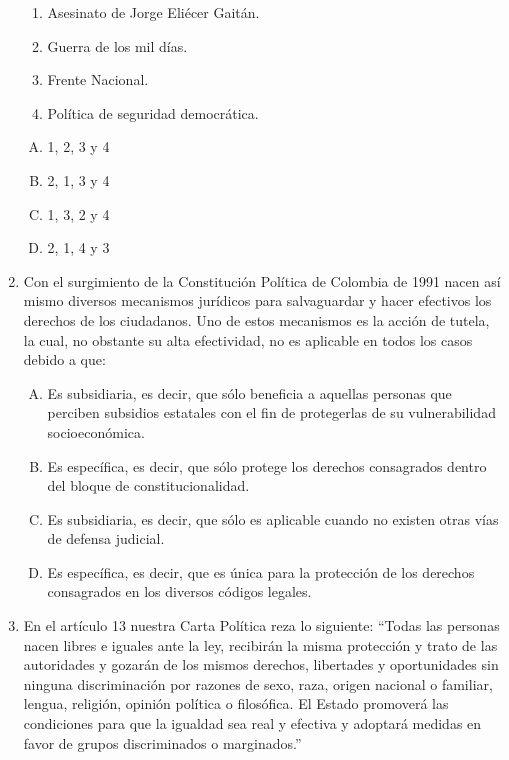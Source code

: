 \begin{enumerate}
\begin{enumerate}[1.]
\item Asesinato de Jorge Eliécer Gaitán.
\item Guerra de los mil días.
\item Frente Nacional.
\item Política de seguridad democrática.
\end{enumerate}
\begin{enumerate}[(A)]
\item 1, 2, 3 y 4
\item 2, 1, 3 y 4
\item 1, 3, 2 y 4
\item 2, 1, 4 y 3
\end{enumerate}
\item Con el surgimiento de la Constitución Política de Colombia de 1991 nacen así mismo diversos mecanismos jurídicos para salvaguardar y hacer efectivos los derechos de los ciudadanos. Uno de estos mecanismos es la acción de tutela, la cual, no obstante su alta efectividad, no es aplicable en todos los casos debido a que:\label{socandres-18}

\begin{enumerate}[(A)]
\item Es subsidiaria, es decir, que sólo beneficia a aquellas personas que perciben subsidios estatales con el fin de protegerlas de su vulnerabilidad socioeconómica. 
\item Es específica, es decir, que sólo protege los derechos consagrados dentro del bloque de constitucionalidad.
\item Es subsidiaria, es decir, que sólo es aplicable cuando no existen otras vías de defensa judicial.
\item Es específica, es decir, que es única para la protección de los derechos consagrados en los diversos códigos legales.

\end{enumerate}
\item En el artículo 13 nuestra Carta Política reza lo siguiente: “Todas las personas nacen libres e iguales ante la ley, recibirán la misma protección y trato de las autoridades y gozarán de los mismos derechos, libertades y oportunidades sin ninguna discriminación por razones de sexo, raza, origen nacional o familiar, lengua, religión, opinión política o filosófica.
El Estado promoverá las condiciones para que la igualdad sea real y efectiva y adoptará medidas en favor de grupos discriminados o marginados.”\label{socandres-19}


\end{enumerate}
